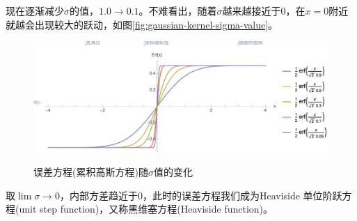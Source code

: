 \begin{subappendices}
现在逐渐减少$\sigma$的值，$1.0 \rightarrow 0.1$。不难看出，随着$\sigma$越来越接近于$0$，在$x=0$附近就越会出现较大的跃动，如图\eqref{fig:gaussian-kernel-sigma-value}。
\begin{figure}[htbp]
  \caption{误差方程(累积高斯方程)随$\sigma$值的变化}
  \centering
  \includegraphics[width=12cm]{./Figures/20180405-gaussian-sigma-value}
  \label{fig:gaussian-kernel-sigma-value}
%
\end{figure}

取$\lim \sigma \rightarrow 0$，内部方差趋近于$0$，此时的误差方程我们成为Heaviside 单位阶跃方程(unit step function)，又称黑维塞方程(Heaviside function)。
































\end{subappendices}
